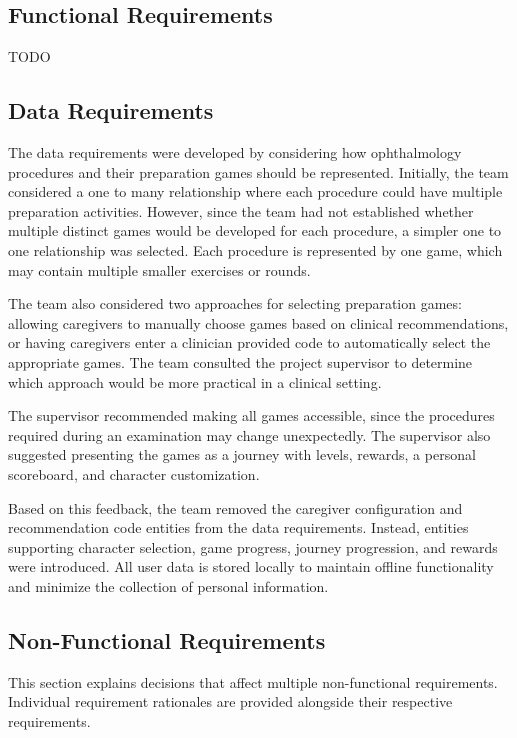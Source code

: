 \documentclass[12pt]{article}
\begin{document}
\subsection{Functional Requirements}

TODO

\subsection{Data Requirements}

The data requirements were developed by considering how
ophthalmology procedures and their preparation games should
be represented. Initially, the team considered a one to many
relationship where each procedure could have multiple
preparation activities. However, since the team had not established
whether multiple distinct games would be developed for
each procedure, a simpler one to one relationship was selected.
Each procedure is represented by one game, which may contain
multiple smaller exercises or rounds.

The team also considered two approaches for selecting preparation
games: allowing caregivers to manually choose games based
on clinical recommendations, or having caregivers enter a
clinician provided code to automatically select the appropriate
games. The team consulted the project supervisor to determine
which approach would be more practical in a clinical setting.

The supervisor recommended making all games accessible,
since the procedures required during an examination may
change unexpectedly. The supervisor also suggested presenting the
games as a journey with levels, rewards, a personal
scoreboard, and character customization.

Based on this feedback, the team removed the caregiver configuration
and recommendation code entities from the data requirements.
Instead, entities supporting character selection, 
game progress, journey progression, and rewards
were introduced. All user data is stored locally to maintain
offline functionality and minimize the collection of
personal information.

\subsection{Non-Functional Requirements}

This section explains decisions that affect multiple non-functional requirements. Individual
requirement rationales are provided alongside their respective requirements.
\end{document}

